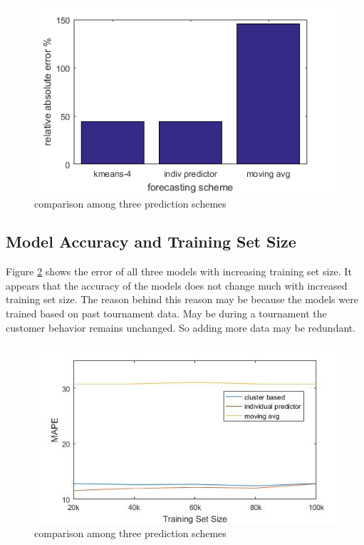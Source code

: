 \begin{figure}[h!]
\centering
\begin{minipage}{.5\textwidth}
  \centering
  \includegraphics[width=\linewidth]{final-relative-abs-error.png}
  \caption{comparison among three prediction schemes}
  \label{fig:prediction-scheme-vs-error}
\end{minipage}
  
\end{figure}

\subsection{Model Accuracy and Training Set Size}
Figure \ref{fig:trainset-vs-error} shows the error of all three models with increasing training set size. It appears that the accuracy of the models does not change much with increased training set size. The reason behind this reason may be because the models were trained based on past tournament data. May be during a tournament the customer behavior remains unchanged. So adding more data may be redundant. 

\begin{figure}[h!]
\centering
\begin{minipage}{.5\textwidth}
  \centering
  \includegraphics[width=\linewidth]{error-change-training-size.jpg}
  \caption{comparison among three prediction schemes}
  \label{fig:trainset-vs-error}
\end{minipage}
  
\end{figure}